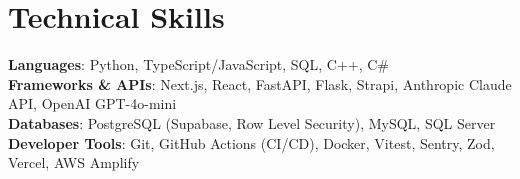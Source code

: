 \documentclass[letterpaper,11pt]{article}
\begin{document}
\section{Technical Skills}
 \begin{itemize}[leftmargin=0.15in, label={}]
    \small{\item{
     \textbf{Languages}{: Python, TypeScript/JavaScript, SQL, C++, C\#} \\
     \textbf{Frameworks \& APIs}{: Next.js, React, FastAPI, Flask, Strapi, Anthropic Claude API, OpenAI GPT-4o-mini} \\
     \textbf{Databases}{: PostgreSQL (Supabase, Row Level Security), MySQL, SQL Server} \\
     \textbf{Developer Tools}{: Git, GitHub Actions (CI/CD), Docker, Vitest, Sentry, Zod, Vercel, AWS Amplify}
    }}
 \end{itemize}


\end{document}
